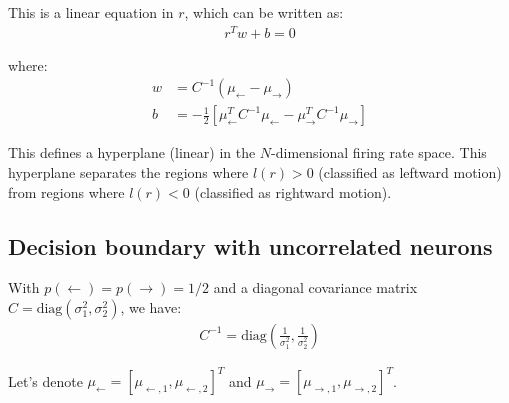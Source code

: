 \documentclass{article}
\begin{document}
This is a linear equation in $r$, which can be written as:
\begin{align}
r^T w + b = 0
\end{align}

where:
\begin{align}
w &= C^{-1}(\mu_\leftarrow - \mu_\rightarrow) \\
b &= -\frac{1}{2}\left[\mu_\leftarrow^T C^{-1} \mu_\leftarrow - \mu_\rightarrow^T C^{-1} \mu_\rightarrow\right]
\end{align}

This defines a hyperplane (linear) in the $N$-dimensional firing rate space. This hyperplane separates the regions where $l(r) > 0$ (classified as leftward motion) from regions where $l(r) < 0$ (classified as rightward motion).

\subsection{Decision boundary with uncorrelated neurons}
With $p(\leftarrow) = p(\rightarrow) = 1/2$ and a diagonal covariance matrix $C = \text{diag}(\sigma_1^2, \sigma_2^2)$, we have:
\begin{align}
C^{-1} = \text{diag}\left(\frac{1}{\sigma_1^2}, \frac{1}{\sigma_2^2}\right)
\end{align}

Let's denote $\mu_\leftarrow = [\mu_{\leftarrow,1}, \mu_{\leftarrow,2}]^T$ and $\mu_\rightarrow = [\mu_{\rightarrow,1}, \mu_{\rightarrow,2}]^T$.
\end{document}
